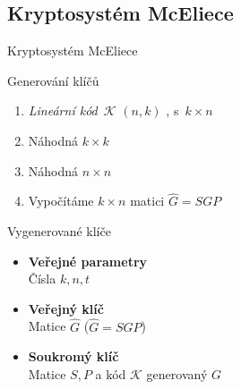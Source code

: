 \documentclass{beamer}
\begin{document}
\subsection{Kryptosystém McEliece}
\begin{frame}{Kryptosystém McEliece}

    \begin{block}{Generování klíčů}
        \begin{enumerate}

            \item \emph{Lineární kód}~$\mathcal{K}$ $(n,k)$
                , s~$k \times n$ 
            \item Náhodná $k \times k$ 
            \item Náhodná $n \times n$ 
            \item Vypočítáme $k \times n$ matici $\hat{G} = S G P$

        \end{enumerate}
    \end{block}

    \begin{block}{Vygenerované klíče}
        \begin{itemize}
            \item[] \textbf{Veřejné parametry} \hfil \\
                \hspace{0.5cm} Čísla $k, n, t$
            \item[] \textbf{Veřejný klíč} \hfil \\
                \hspace{0.5cm} Matice $\hat{G}$ ($\hat{G} = S G P$)
            \item[] \textbf{Soukromý klíč} \hfil \\
                \hspace{0.5cm} Matice $S, P$ a kód $\mathcal{K}$ generovaný $G$
        \end{itemize}
    \end{block}

\end{frame}
\end{document}
